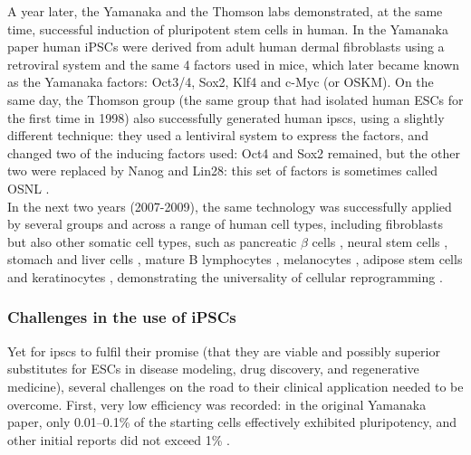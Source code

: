 A year later, the Yamanaka and the Thomson labs demonstrated, at the same time, successful induction of pluripotent stem cells in human.
In the Yamanaka paper \cite{takahashi2007induction} human iPSCs were derived from adult human dermal fibroblasts using a retroviral system and the same 4 factors used in mice, which later became known as the Yamanaka factors: Oct3/4, Sox2, Klf4 and c-Myc (or OSKM).
On the same day, the Thomson group (the same group that had isolated human ESCs for the first time in 1998) also successfully generated human \glspl{ipsc}, using a slightly different technique: they used a lentiviral system to express the factors, and changed two of the inducing factors used: Oct4 and Sox2 remained, but the other two were replaced by Nanog and Lin28: this set of factors is sometimes called OSNL \cite{yu2007induced}.\\

In the next two years (2007-2009), the same technology was successfully applied by several groups and across a range of human cell types, including fibroblasts \cite{park2008reprogramming} but also other somatic cell types, such as pancreatic $\beta$ cells \cite{stadtfeld2008reprogramming}, neural stem cells \cite{eminli2008reprogramming, kim2008pluripotent}, stomach and liver cells \cite{aoi2008generation}, mature B lymphocytes \cite{hanna2008direct}, melanocytes \cite{utikal2009sox2}, adipose stem cells \cite{sun2009feeder} and keratinocytes \cite{maherali2008high}, demonstrating the universality of cellular reprogramming \cite{omole2018ten}.


\subsubsection{Challenges in the use of iPSCs}
Yet for \glspl{ipsc} to fulfil their promise (that they are viable and possibly superior substitutes for ESCs in disease modeling, drug discovery, and regenerative medicine), several challenges on the road to their clinical application needed to be overcome.
First, very low efficiency was recorded: in the original Yamanaka paper, only 0.01–0.1\% \cite{takahashi2006induction} of the starting cells effectively exhibited pluripotency, and other initial reports did not exceed 1\% \cite{takahashi2007induction, okita2007generation, lowry2008generation}.

